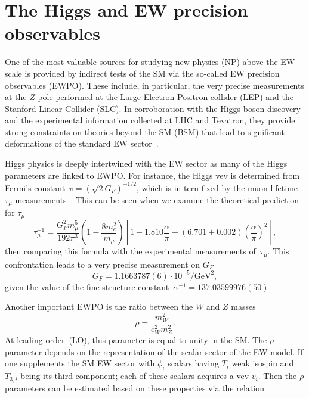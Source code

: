 \section{The Higgs and EW precision observables}
One of the most valuable sources for studying new physics (NP) above the EW scale is provided by indirect tests of the SM via the so-called EW precision observables (EWPO). These include, in particular, the very precise measurements at the $Z$ pole performed at the Large Electron-Positron collider (LEP) and the Stanford Linear Collider (SLC). In corroboration with the Higgs boson discovery and the experimental information collected at LHC and Tevatron, they provide strong constraints on theories beyond the SM (BSM) that lead to significant deformations of the standard EW sector~\cite{Falkowski:2013dza,Ciuchini:2013pca,Falkowski:2014tna,deBlas:2015aea,deBlas:2016ojx,deBlas:2017wmn,Haller:2018nnx,Ellis:2018gqa,Erler:2019hds,Dawson:2020oco}.
\par Higgs physics is deeply intertwined with the EW sector as many of the Higgs parameters are linked to EWPO. For instance, the Higgs vev is determined from Fermi's constant~$v =(\sqrt{2}G_F)^{-1/2}$, which is in tern fixed by the muon lifetime~$ \tau_\mu$ measurements~\cite{PhysRev.101.866,PhysRev.113.1652,Mohammad:1976qd,PhysRevLett.82.488}. This can be seen when we examine the theoretical prediction for $ \tau_\mu$ 
\begin{equation}
	\tau_\mu^{-1} = \frac{G_F^2 m_\mu^5}{192\pi^3}\left(1-\frac{8 m_e^2}{m_\mu}\right) \left[1-1.810\frac{\alpha}{\pi}+(6.701\pm0.002)\left(\frac{\alpha}{\pi}\right)^2\right],
\end{equation}
then comparing this formula with the experimental measurements of~$ \tau_\mu$. This confrontation leads to a very precise measurement on $G_F$~\cite{Zyla:2020zbs}
\begin{equation}
	G_F=1.1663787(6) \cdot 10^{-5} \si{\per\GeV\squared},
\end{equation}
given the value of the fine structure constant~$\alpha^{-1} =137.03599976 (50)$. 
\par Another important EWPO is the ratio between the $W$ and $Z$ masses
\begin{equation}
	\rho = \frac{m_W^2}{c_W^2m_Z^2}.
\end{equation}
At leading order~(LO), this parameter is equal to unity in the SM. The $\rho$ parameter depends on the representation of the scalar sector of the EW model. If one supplements the SM EW sector with $\phi_i$ scalars having $T_i$ weak isospin and $T_{3,i}$ being its third component; each of these scalars acquires a vev $v_i$. Then the $\rho$ parameters can be estimated based on these properties via the relation~\cite{ROSS1975135,Djouadi:2005gi}
